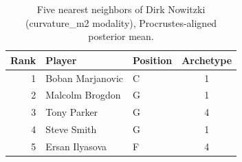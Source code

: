 \begin{table}[htbp]
  \centering\small
  \begin{tabular}{rllc}
    \toprule
    Rank & Player & Position & Archetype \\
    \midrule
    1 & Boban Marjanovic & C & 1 \\
    2 & Malcolm Brogdon & G & 1 \\
    3 & Tony Parker & G & 4 \\
    4 & Steve Smith & G & 1 \\
    5 & Ersan Ilyasova & F & 4 \\
    \bottomrule
  \end{tabular}
  \caption{Five nearest neighbors of Dirk Nowitzki (curvature_m2 modality), Procrustes-aligned posterior mean.}
  \label{tab:Dirk_Nowitzki_neighbors_curvature_m2}
\end{table}

